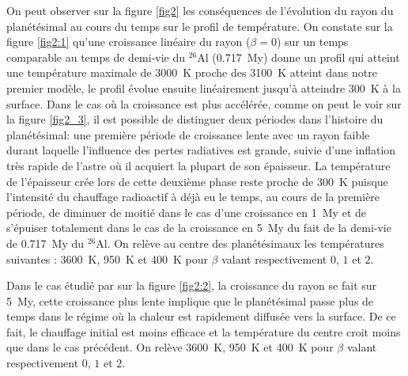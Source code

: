 \documentclass[10pt,a4paper]{article}
\numberwithin{equation}{section}
\begin{document}
On peut observer sur la figure \ref{fig2} les conséquences de l'évolution du rayon du planétésimal au cours du temps sur le profil de température. On constate sur la figure \ref{fig2:1} qu'une croissance linéaire du rayon ($\beta=0$) sur un temps comparable au temps de demi-vie du $^{26}$Al (\SI{0.717}{My}) donne un profil qui atteint une température maximale de \SI{3000}{K} proche des \SI{3100}{K} atteint dans notre premier modèle, le profil évolue ensuite linéairement jusqu'à atteindre \SI{300}{K} à la surface. Dans le cas où la croissance est plus accélérée, comme on peut le voir sur la figure \ref{fig2_3}, il est possible de distinguer deux périodes dans l'histoire du planétésimal: une première période de croissance lente avec un rayon faible durant laquelle l'influence des pertes radiatives est grande, suivie d'une inflation très rapide de l'astre où il acquiert la plupart de son épaisseur. La température de l'épaisseur crée lors de cette deuxième phase reste proche de \SI{300}{K} puisque l'intensité du chauffage radioactif à déjà eu le temps, au cours de la première période, de diminuer de moitié dans le cas d'une croissance en \SI{1}{My} et de s'épuiser totalement dans le cas de la croissance en \SI{5}{My} du fait de la demi-vie de \SI{0.717}{My} du $^{26}$Al. On relève au centre des planétésimaux les températures suivantes : \SI{3600}{K}, \SI{950}{K} et \SI{400}{K} pour $\beta$ valant respectivement $0$, $1$ et $2$.

Dans le cas étudié par sur la figure \ref{fig2:2}, la croissance du rayon se fait sur \SI{5}{My}, cette croissance plus lente implique que le planétésimal passe plus de temps dans le régime où la chaleur est rapidement diffusée vers la surface. De ce fait, le chauffage initial est moins efficace et la température du centre croit moins que dans le cas précédent. On relève \SI{3600}{K}, \SI{950}{K} et \SI{400}{K} pour $\beta$ valant respectivement $0$, $1$ et $2$. 
\end{document}
